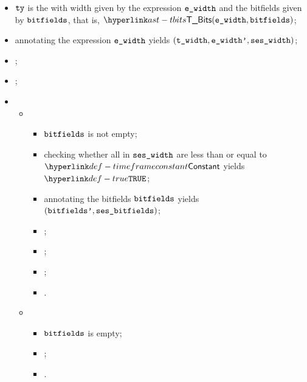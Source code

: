 \ProseParagraph
\AllApply
\begin{itemize}
  \item $\texttt{ty}$ is the \bitvectortypeterm{} with width given by the expression
    $\texttt{e\_width}$ and the bitfields given by $\texttt{bitfields}$, that is, $\TBits(\ewidth, \bitfields)$;
  \item annotating the expression $\texttt{e\_width}$ yields $(\texttt{t\_width}, \texttt{e\_width'}, \texttt{ses\_width})$\ProseOrTypeError;
  \item \Prosechecksymbolicallyevaluable{\seswidth};
  \item \Prosecheckconstrainedinteger{$\tenv$}{$\twidth$};
  \item \OneApplies
  \begin{itemize}
    \item {}
    \begin{itemize}
      \item $\texttt{bitfields}$ is not empty;
      \item checking whether all \timeframesterm{} in $\seswidth$ are less than or equal to $\timeframeconstant$
            yields $\True$\ProseTerminateAs{\SideEffectViolation};
      \item annotating the bitfields $\texttt{bitfields}$ yields \\
            $(\texttt{bitfields'}, \texttt{ses\_bitfields})$\ProseOrTypeError;
      \item \Prosestaticeval{$\tenv$}{$\ewidthp$}{$\lint(\vwidth)$};
      \item \Prosecheckcommonbitfieldsalign{$\tenv$}{$\bitfieldsp$}{$\vwidth$}\ProseOrTypeError;
      \item {};
      \item {}.
    \end{itemize}

    \item {}
    \begin{itemize}
      \item $\texttt{bitfields}$ is empty;
      \item {};
      \item \Proseeqdef{$\vses$}{$\seswidth$}.
    \end{itemize}
  \end{itemize}
\end{itemize}

